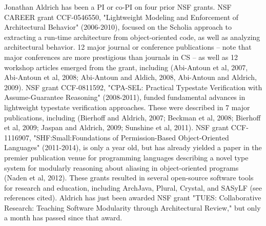 \documentclass[11pt,letterpaper]{article}
\begin{document}
Jonathan Aldrich has been a PI or co-PI on four prior NSF grants.  NSF CAREER grant CCF-0546550, "Lightweight Modeling and Enforcement of Architectural Behavior" (2006-2010), focused on the Scholia approach to extracting a run-time architecture from object-oriented code, as well as analyzing architectural behavior.  12 major journal or conference publications -- note that major conferences are more prestigious than journals in CS -- as well as 12 workshop articles emerged from the grant, including (Abi-Antoun et al, 2007, Abi-Antoun et al, 2008; Abi-Antoun and Aldich, 2008, Abi-Antoun and Aldrich, 2009).  NSF grant CCF-0811592, "CPA-SEL: Practical Typestate Verification with Assume-Guarantee Reasoning" (2008-2011), funded fundamental advances in lightweight typestate verification approaches.  These were described in 7 major publications, including (Bierhoff and Aldrich, 2007; Beckman et al, 2008; Bierhoff et al, 2009; Jaspan and Aldrich, 2009; Sunshine et al, 2011).  NSF grant CCF-1116907, "SHF:Small:Foundations of Permission-Based Object-Oriented Languages" (2011-2014), is only a year old, but has already yielded a paper in the premier publication venue for programming languages describing a novel type system for modularly reasoning about aliasing in object-oriented programs (Naden et al, 2012).  These grants resulted in several open-source software tools for research and education, including ArchJava, Plural, Crystal, and SASyLF (see references cited).  Aldrich has just been awarded NSF grant "TUES: Collaborative Research: Teaching Software Modularity through Architectural Review," but only a month has passed since that award. 




\listoftodos
\end{document}
